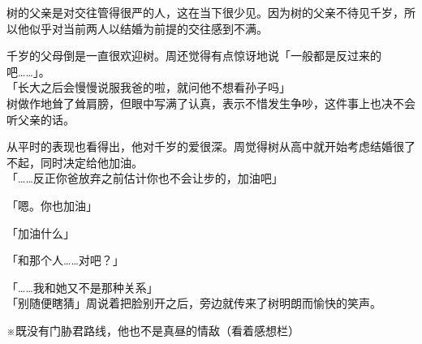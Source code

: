 树的父亲是对交往管得很严的人，这在当下很少见。因为树的父亲不待见千岁，所以他似乎对当前两人以结婚为前提的交往感到不满。

千岁的父母倒是一直很欢迎树。周还觉得有点惊讶地说「一般都是反过来的吧……」。\\

「长大之后会慢慢说服我爸的啦，就问他不想看孙子吗」\\

树做作地耸了耸肩膀，但眼中写满了认真，表示不惜发生争吵，这件事上也决不会听父亲的话。

从平时的表现也看得出，他对千岁的爱很深。周觉得树从高中就开始考虑结婚很了不起，同时决定给他加油。\\

「……反正你爸放弃之前估计你也不会让步的，加油吧」

「嗯。你也加油」

「加油什么」

「和那个人……对吧？」

「……我和她又不是那种关系」\\

「别随便瞎猜」周说着把脸别开之后，旁边就传来了树明朗而愉快的笑声。

\atogakiline

※既没有门胁君路线，他也不是真昼的情敌（看着感想栏）
